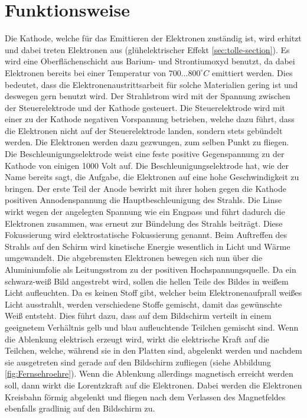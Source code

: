 \section{Funktionsweise}
\label{sec:Funktionsweise}
Die Kathode, welche für das Emittieren der Elektronen zuständig ist, wird erhitzt und dabei treten Elektronen aus (glühelektrischer Effekt \ref{sec:tolle-section}).
Es wird eine Oberflächenschicht aus Barium- und Strontiumoxyd benutzt, da  dabei Elektronen bereits bei einer Temperatur von $700...800 ^\circ C$ emittiert werden.
Dies bedeutet, dass die Elektronenaustrittsarbeit für solche Materialien gering ist und deswegen gern benutzt wird.
Der Strahlstrom wird mit der Spannung zwischen der Steuerelektrode und der Kathode gesteuert.
Die Steuerelektrode wird mit einer zu der Kathode negativen Vorspannung betrieben, welche dazu führt, dass die Elektronen nicht auf der Steuerelektrode landen, sondern stets gebündelt werden.
Die Elektronen werden dazu gezwungen, zum selben Punkt zu fliegen.
Die Beschleunigungselektrode weist eine feste positive Gegenspannung zu der Kathode von einigen 1000 Volt auf. 
Die Beschleunigungselektrode hat, wie der Name bereits sagt, die Aufgabe, die Elektronen auf eine hohe Geschwindigkeit zu bringen.
Der erste Teil der Anode bewirkt mit ihrer hohen gegen die Kathode positiven Annodenspannung die Hauptbeschleunigung des Strahls.
Die Linse wirkt wegen der angelegten Spannung wie ein Engpass und führt dadurch die Elektronen zusammen, was erneut zur Bündelung des Strahls beiträgt.
Diese Fokussierung wird elektrostatische Fokussierung genannt.
Beim Auftreffen des Strahls auf den Schirm wird kinetische Energie wesentlich in Licht und Wärme umgewandelt.
Die abgebremsten Elektronen bewegen sich nun über die Aluminiumfolie als Leitungsstrom zu der positiven Hochspannungsquelle.
Da ein schwarz-weiß Bild angestrebt wird, sollen die hellen Teile des Bildes in weißem Licht aufleuchten.
Da es keinen Stoff gibt, welcher beim Elektronenaufprall weißes Licht ausstrahlt, werden verschiedene Stoffe gemischt, damit das gewünschte Weiß entsteht.
Dies führt dazu, dass auf dem Bildschirm verteilt in einem geeignetem Verhältnis gelb und blau aufleuchtende Teilchen gemischt sind.
Wenn die Ablenkung elektrisch erzeugt wird, wirkt die elektrische Kraft auf die Teilchen, welche, während sie in den Platten sind, abgelenkt werden und nachdem sie ausgetreten sind gerade auf den Bildschirm zufliegen (siehe Abbildung \ref{fig:Fernsehroehre}).
Wenn die Ablenkung allerdings magnetisch erreicht werden soll, dann wirkt die Lorentzkraft auf die Elektronen.
Dabei werden die Elektronen Kreisbahn förmig abgelenkt und fliegen nach dem Verlassen des Magnetfeldes ebenfalls gradlinig auf den Bildschirm zu.
